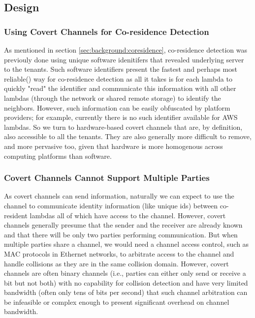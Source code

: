 \subsection{Design}

\subsubsection{Using Covert Channels for Co-residence Detection}
As mentioned in section \ref{sec:background:coresidence}, co-residence detection 
was previouly done using unique software idenitifers that revealed underlying server 
to the tenants. Such software identifiers present the fastest and perhaps most 
reliable() way for co-residence detection 
as all it takes is for each lambda to quickly
"read" the identifier and communicate this information with all other lambdas 
(through the network or shared remote storage) to identify the 
neighbors. However, such information can be easily obfuscated by platform providers;
for example, currently there is no such identifier available for AWS lambdas. 
So we turn to hardware-based covert channels that are, by definition, also accessible to all the 
tenants. They are also generally more difficult to remove, and more pervasive too, 
given that hardware is more homogenous across computing platforms than software. 


\subsubsection{Covert Channels Cannot Support Multiple Parties}
As covert channels can send information, naturally we can expect to use the 
channel to communicate identity information (like unique ids) between 
co-resident lambdas all of which have access to the channel. However,
covert channels generally presume that the sender and the receiver are 
already known and that there will be only two parties performing 
communication. But when multiple parties share a channel, we would need 
a channel access control, such as MAC protocols in Ethernet networks, 
to arbitrate access to the channel and handle collisions as they 
are in the same collision domain. However, covert channels are often 
binary channels (i.e., parties can either only send or receive a bit 
but not both) with no capability for collision detection and have very 
limited bandwidth (often only tens of bits per second) that such 
channel arbitration can be infeasible or complex enough to present 
significant overhead on channel bandwidth. 



